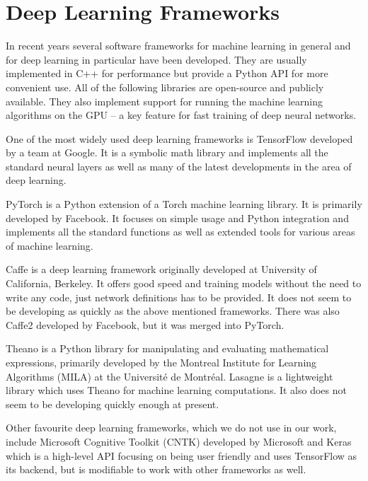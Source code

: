 \section{Deep Learning Frameworks}
In recent years several software frameworks for machine learning in general and for deep learning in particular have been developed. They are usually implemented in C++ for performance but provide a Python API for more convenient use. All of the following libraries are open-source and publicly available. They also implement support for running the machine learning algorithms on the GPU -- a key feature for fast training of deep neural networks. \par
One of the most widely used deep learning frameworks is TensorFlow \cite{martin_abadi_tensorflow:_2015} developed by a team at Google. It is a symbolic math library and implements all the standard neural layers as well as many of the latest developments in the area of deep learning.  \par
PyTorch \cite{paszke_automatic_2017} is a Python extension of a Torch machine learning library. It is primarily developed by Facebook. It focuses on simple usage and Python integration and implements all the standard functions as well as extended tools for various areas of machine learning. \par
Caffe \cite{jia_caffe:_2014} is a deep learning framework originally developed at University of California, Berkeley. It offers good speed and training models without the need to write any code, just network definitions has to be provided. It does not seem to be developing as quickly as the above mentioned frameworks. There was also Caffe2 developed by Facebook, but it was merged into PyTorch. \par
Theano \cite{theano_development_team_theano:_2016} is a Python library for manipulating and evaluating mathematical expressions, primarily developed by the Montreal Institute for Learning Algorithms (MILA) at the Université de Montréal. Lasagne \cite{dieleman_lasagne:_2015} is a lightweight library which uses Theano for machine learning computations. It also does not seem to be developing quickly enough at present. \par
Other favourite deep learning frameworks, which we do not use in our work, include Microsoft Cognitive Toolkit (CNTK) \cite{seide_cntk:_2016} developed by Microsoft and Keras \cite{chollet_keras_2015} which is a high-level API focusing on being user friendly and uses TensorFlow as its backend, but is modifiable to work with other frameworks as well.


